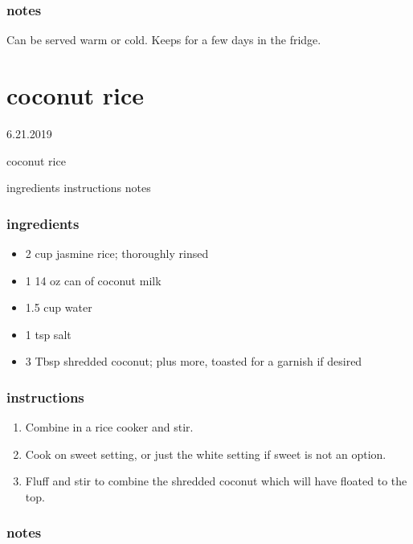 \documentclass[]{book}
\providecommand{\tightlist}{%
  \setlength{\itemsep}{0pt}\setlength{\parskip}{0pt}}
\begin{document}
\hypertarget{notes-22}{%
\subsection{notes}\label{notes-22}}

Can be served warm or cold. Keeps for a few days in the fridge.

\hypertarget{coconut-rice}{%
\chapter{coconut rice}\label{coconut-rice}}

6.21.2019

coconut rice

ingredients \textbar{}
instructions \textbar{}
notes

\hypertarget{ingredients-23}{%
\subsection{ingredients}\label{ingredients-23}}

\begin{itemize}
\tightlist
\item
  2 cup jasmine rice; thoroughly rinsed
\item
  1 14 oz can of coconut milk
\item
  1.5 cup water
\item
  1 tsp salt
\item
  3 Tbsp shredded coconut; plus more, toasted for a garnish if desired
\end{itemize}

\hypertarget{instructions-23}{%
\subsection{instructions}\label{instructions-23}}

\begin{enumerate}
\def\labelenumi{\arabic{enumi}.}
\tightlist
\item
  Combine in a rice cooker and stir.
\item
  Cook on sweet setting, or just the white setting if sweet is not an option.
\item
  Fluff and stir to combine the shredded coconut which will have floated to the top.
\end{enumerate}

\hypertarget{notes-23}{%
\subsection{notes}\label{notes-23}}
\end{document}

